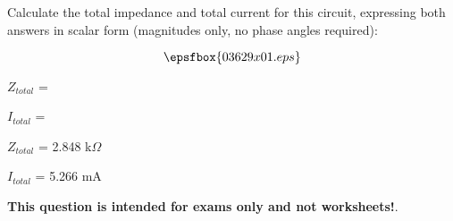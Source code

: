 

Calculate the total impedance and total current for this circuit, expressing both answers in scalar form (magnitudes only, no phase angles required):

$$\epsfbox{03629x01.eps}$$

$Z_{total}$ = 

\vskip 10pt

$I_{total}$ = 







$Z_{total}$ = 2.848 k$\Omega$

\vskip 10pt

$I_{total}$ = 5.266 mA







{\bf This question is intended for exams only and not worksheets!}.



